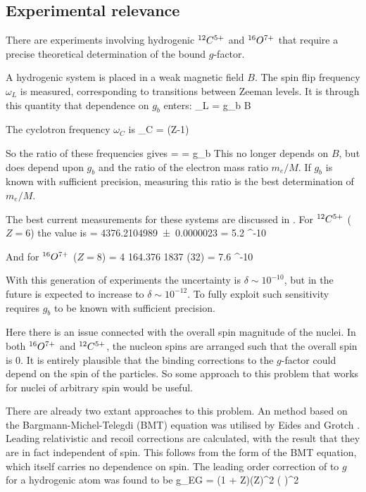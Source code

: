 \subsection{Experimental relevance}
There are experiments involving hydrogenic $^{12}C^{5+}$ and $^{16}O^{7+}$ that require a precise theoretical determination of the bound $g$-factor.


A hydrogenic system is placed in a weak magnetic field $B$.  The spin flip frequency $\omega_L$ is measured, corresponding to transitions between Zeeman levels.  It is through this quantity that dependence on $g_b$ enters:
\beq
	\omega_L = g_b  B
\eeq

The cyclotron frequency $\omega_C$ is
\beq
	\omega_C = (Z-1) 
\eeq

So the ratio of these frequencies gives
\beq
	 =  = 
	g_b  
\eeq
This no longer depends on $B$, but does depend upon $g_b$ and the ratio of the electron mass ratio $m_e/M$.  If $g_b$ is known with sufficient precision, measuring this ratio is the best determination of $m_e/M$.

The best current measurements for these systems are discussed in \cite{2006IJMSp.251..152W}.  For $^{12}C^{5+}$ ($Z=6$) the value is
\beq
	  = \num{4376.2104989(23)}	\hspace{3em} 	\delta= 5.2 ^{-10}
\eeq

And for $^{16}O^{7+}$ ($Z=8$)
\beq
		  = \num{4 164.376 1837 (32)} \hspace{3em} \delta= 7.6 ^{-10}
\eeq

With this generation of experiments the uncertainty is $\delta \sim 10^{-10}$, but in the future is expected to increase to $\delta \sim 10^{-12}$.  To fully exploit such sensitivity requires $g_b$ to be known with sufficient precision.

Here there is an issue connected with the overall spin magnitude of the nuclei.  In both $^{16}O^{7+}$ and $^{12}C^{5+}$, the nucleon spins are arranged such that the overall spin is $0$.  It is entirely plausible that the binding corrections to the $g$-factor could depend on the spin of the particles.  So some approach to this problem that works for nuclei of arbitrary spin would be useful.


There are already two extant approaches to this problem.  An method based on the Bargmann-Michel-Telegdi (BMT) equation was utilised by Eides and Grotch \cite{Eides:1997sq}.  Leading relativistic and recoil corrections are calculated, with the result that they are in fact independent of spin.  This follows from the form of the BMT equation, which itself carries no dependence on spin.  The leading order correction of to $g$ for a hydrogenic atom was found to be
\beq
	\Delta g_{EG} = (1 + Z)(Z\alpha)^2 \left(  \right )^2
\eeq 

